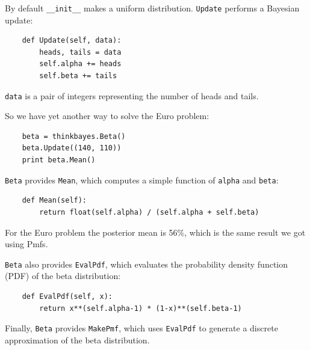 \documentclass[12pt]{book}
\begin{document}
By default \verb"__init__" makes a uniform distribution.
{\tt Update} performs a Bayesian update:

\begin{verbatim}
    def Update(self, data):
        heads, tails = data
        self.alpha += heads
        self.beta += tails
\end{verbatim}

{\tt data} is a pair of integers representing the number of
heads and tails.

So we have yet another way to solve the Euro problem:

\begin{verbatim}
    beta = thinkbayes.Beta()
    beta.Update((140, 110))
    print beta.Mean()
\end{verbatim}

{\tt Beta} provides {\tt Mean}, which 
computes a simple function of {\tt alpha}
and {\tt beta}:

\begin{verbatim}
    def Mean(self):
        return float(self.alpha) / (self.alpha + self.beta)
\end{verbatim}

For the Euro problem the posterior mean is 56\%, which is the
same result we got using Pmfs.  

{\tt Beta} also provides {\tt EvalPdf}, which evaluates
the probability density
function (PDF)  of the beta distribution:

\begin{verbatim}
    def EvalPdf(self, x):
        return x**(self.alpha-1) * (1-x)**(self.beta-1)
\end{verbatim}

Finally, {\tt Beta} provides {\tt MakePmf}, which
uses {\tt EvalPdf} to generate a discrete approximation
of the beta distribution.



\end{document}
